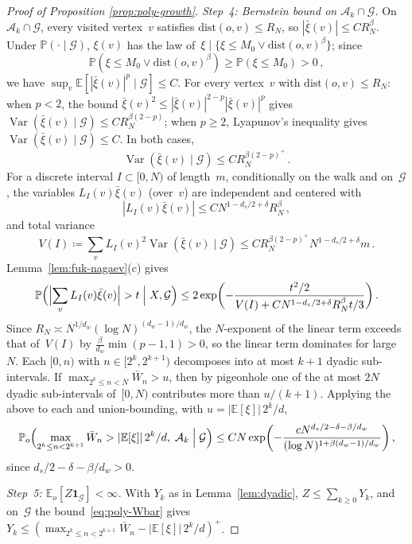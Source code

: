 \documentclass[11pt]{amsart}
\theoremstyle{plain}
\theoremstyle{definition}
\newcommand{\E}{\mathbb{E}}
\renewcommand{\P}{\mathbb{P}}
\newcommand{\one}{\mathbf{1}}
\DeclareMathOperator{\var}{Var}
\begin{document}
\begin{proof}[Proof of Proposition \ref{prop:poly-growth}]
		\emph{Step~4: Bernstein bound on $\mathcal{A}_k\cap\mathcal{G}$.}
		On $\mathcal{A}_k\cap\mathcal{G}$, every visited vertex~$v$ satisfies $\mathrm{dist}(o,v)\leq R_N$, so $|\bar\xi(v)| \leq CR_N^{\beta}$.
		Under $\P(\cdot\mid\mathcal{G})$, $\xi(v)$ has the law of~$\xi\mid\{\xi\leq M_0\vee \mathrm{dist}(o,v)^\beta\}$; since
		\[
		\P(\xi\leq M_0\vee \mathrm{dist}(o,v)^\beta)\geq\P(\xi\leq M_0)>0\,,
		\]
		we have $\sup_v\E[|\bar\xi(v)|^p\mid\mathcal{G}]\leq C$. For every vertex~$v$ with $\mathrm{dist}(o,v)\leq R_N$: when $p<2$, the bound $\bar\xi(v)^2\leq |\bar\xi(v)|^{2-p}|\bar\xi(v)|^p$ gives $\var(\bar\xi(v)\mid\mathcal{G})\leq CR_N^{\beta(2-p)}$; when $p\geq 2$, Lyapunov's inequality gives $\var(\bar\xi(v)\mid\mathcal{G})\leq C$. In both cases,
		\[
		\var(\bar\xi(v)\mid\mathcal{G})\leq CR_N^{\beta(2-p)^+}\,.
		\]
		For a discrete interval $I\subset[0,N)$ of length~$m$, conditionally on the walk and on~$\mathcal{G}$, the variables $L_I(v)\bar\xi(v)$ (over~$v$) are independent and centered with
		\[
		|L_I(v)\bar\xi(v)| \leq CN^{1-d_s/2+\delta}R_N^{\beta}\,,
		\]
		and total variance
		\[
		V(I) \coloneqq \sum_v L_I(v)^2\var(\bar\xi(v)\mid\mathcal{G}) \leq CR_N^{\beta(2-p)^+} N^{1-d_s/2+\delta} m\,.
		\]
		Lemma~\ref{lem:fuk-nagaev}(c) gives
		\[
		\P\Bigl(\Bigl|\sum_v L_I(v)\bar\xi(v)\Bigr|>t\;\Big|\;X,\mathcal{G}\Bigr)
		\leq 2\exp\biggl(-\frac{t^2/2}{V(I) + C N^{1-d_s/2+\delta}R_N^{\beta} t/3}\biggr)\,.
		\]
		Since $R_N\asymp N^{1/d_w}(\log N)^{(d_w-1)/d_w}$, the $N$-exponent of the linear term exceeds that of~$V(I)$ by $\tfrac{\beta}{d_w}\min(p{-}1,1)>0$, so the linear term dominates for large~$N$.  Each $[0,n)$ with $n\in[2^k,2^{k+1})$ decomposes into at most $k{+}1$ dyadic sub-intervals.  If $\max_{2^k\leq n<N}\bar W_n>u$, then by pigeonhole one of the at most $2N$ dyadic sub-intervals of~$[0,N)$ contributes more than $u/(k{+}1)$.  Applying the above to each and union-bounding, with $u=|\E[\xi]|\,2^k/d$,
		\begin{equation}\label{eq:poly-Bernstein}
			\P_o\Bigl(\max_{2^k\leq n<2^{k+1}}\bar W_n > |\E[\xi]|\,2^k/d,\;\mathcal{A}_k\;\Big|\;\mathcal{G}\Bigr)
			\leq CN\exp\biggl(-\frac{cN^{d_s/2-\delta-\beta/d_w}}{(\log N)^{1+\beta(d_w-1)/d_w}}\biggr)\,,
		\end{equation}
		since $d_s/2-\delta-\beta/d_w>0$.
		
		\emph{Step~5: $\E_o[Z\one_\mathcal{G}]<\infty$.}
		With $Y_k$ as in Lemma~\ref{lem:dyadic}, $Z\leq\sum_{k\geq 0}Y_k$, and on~$\mathcal{G}$ the bound~\eqref{eq:poly-Wbar} gives $Y_k\leq (\max_{2^k\leq n<2^{k+1}}\bar W_n-|\E[\xi]|\,2^k/d)^+$.
		

\end{proof}
\end{document}
